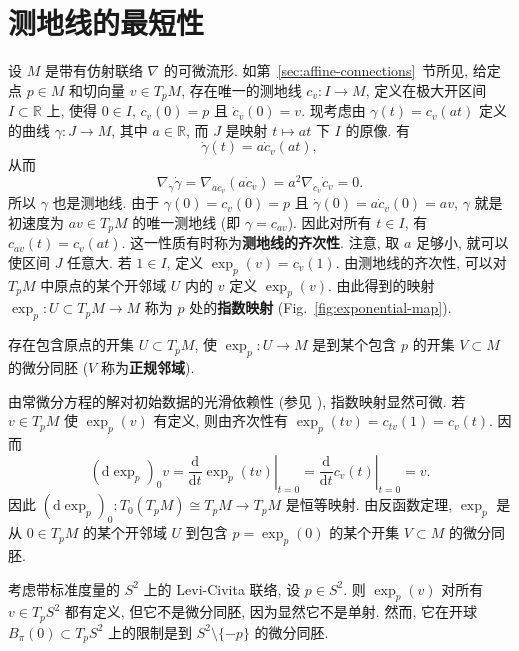 \section{测地线的最短性}\label{sec:minimizing-properties-of-geodesics}

设 $M$ 是带有仿射联络 $\nabla$ 的可微流形. 如第~\ref{sec:affine-connections}~节所见, 给定点 $p\in M$ 和切向量 $v\in T_pM$, 存在唯一的测地线 $c_v:I\to M$, 定义在极大开区间 $I\subset\mathbb{R}$ 上, 使得 $0\in I$, $c_v(0)=p$ 且 $\dot c_v(0)=v$. 现考虑由 $\gamma(t)=c_v(at)$ 定义的曲线 $\gamma:J\to M$, 其中 $a\in\mathbb{R}$, 而 $J$ 是映射 $t\mapsto at$ 下 $I$ 的原像. 有
\[
  \dot\gamma(t)=a\dot c_v(at),
\]
从而
\[
  \nabla_{\dot\gamma}\dot\gamma
  =\nabla_{a\dot c_v}(a\dot c_v)=a^2\nabla_{\dot c_v}\dot c_v=0.
\]
所以 $\gamma$ 也是测地线. 由于 $\gamma(0)=c_v(0)=p$ 且 $\dot\gamma(0)=a\dot c_v(0)=av$, $\gamma$ 就是初速度为 $av\in T_pM$ 的唯一测地线 (即 $\gamma=c_{av}$). 因此对所有 $t\in I$, 有 $c_{av}(t)=c_v(at)$. 这一性质有时称为\textbf{测地线的齐次性}. 注意, 取 $a$ 足够小, 就可以使区间 $J$ 任意大. 若 $1\in I$, 定义 $\exp_p(v)=c_v(1)$. 由测地线的齐次性, 可以对 $T_pM$ 中原点的某个开邻域 $U$ 内的 $v$ 定义 $\exp_p(v)$. 由此得到的映射 $\exp_p:U\subset T_pM\to M$ 称为 $p$ 处的\textbf{指数映射} (Fig.~\ref{fig:exponential-map}).

\begin{RiemannProposition}\label{prop:exponential-map-local-diffeomorphism}
存在包含原点的开集 $U\subset T_pM$, 使 $\exp_p:U\to M$ 是到某个包含 $p$ 的开集 $V\subset M$ 的微分同胚 ($V$ 称为\textbf{正规邻域}).
\end{RiemannProposition}

\begin{RiemannProof}
由常微分方程的解对初始数据的光滑依赖性 (参见 ), 指数映射显然可微. 若 $v\in T_pM$ 使 $\exp_p(v)$ 有定义, 则由齐次性有 $\exp_p(tv)=c_{tv}(1)=c_v(t)$. 因而
\[
  (\mathrm{d}\exp_p)_0v=\left.\frac{\mathrm{d}}{\mathrm{d}t}\exp_p(tv)\right|_{t=0}
  =\left.\frac{\mathrm{d}}{\mathrm{d}t}c_v(t)\right|_{t=0}=v.
\]
因此 $(\mathrm{d}\exp_p)_0:T_0(T_pM)\cong T_pM\to T_pM$ 是恒等映射. 由反函数定理, $\exp_p$ 是从 $0\in T_pM$ 的某个开邻域 $U$ 到包含 $p=\exp_p(0)$ 的某个开集 $V\subset M$ 的微分同胚.
\end{RiemannProof}

\begin{RiemannExample}\label{ex:exponential-map-of-standard-sphere}
考虑带标准度量的 $S^2$ 上的 Levi-Civita 联络, 设 $p\in S^2$. 则 $\exp_p(v)$ 对所有 $v\in T_pS^2$ 都有定义, 但它不是微分同胚, 因为显然它不是单射. 然而, 它在开球 $B_\pi(0)\subset T_pS^2$ 上的限制是到 $S^2\setminus\{-p\}$ 的微分同胚.
\end{RiemannExample}

